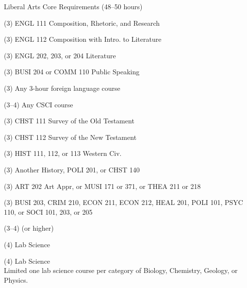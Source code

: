 \begin{reqgroup}{Liberal Arts Core Requirements (48--50 hours)}
\begin{checklist}
\begin{minipage}[t]{0.5\linewidth}
	\item (3) ENGL 111 Composition, Rhetoric, and Research
	\item (3) ENGL 112 Composition with Intro\@. to Literature
	\item (3) ENGL 202, 203, or 204 Literature
	\item (3) BUSI 204 or COMM 110 Public Speaking
	\item (3) Any 3-hour foreign language course
	\item (3--4) Any CSCI course
	\item (3) CHST 111  Survey of the Old Testament
	\item (3) CHST 112  Survey of the New Testament
	\item (3) HIST 111, 112, or 113 Western Civ.
\end{minipage}
\begin{minipage}[t]{0.5\linewidth}
	\item (3) Another History, POLI 201, or CHST 140
	\item (3) ART 202 Art Appr, or MUSI 171 or 371, or THEA 211 or 218
	\item (3) BUSI 203, CRIM 210, ECON 211, ECON 212, HEAL 201, POLI 101, PSYC 110, or SOCI 101, 203, or 205
	\item (3--4)  (or higher)
	\item (4) Lab Science
	\item (4) Lab Science\\Limited one lab science course per category of Biology, Chemistry,
Geology, or Physics.
\end{minipage}
\end{checklist}
\end{reqgroup}



